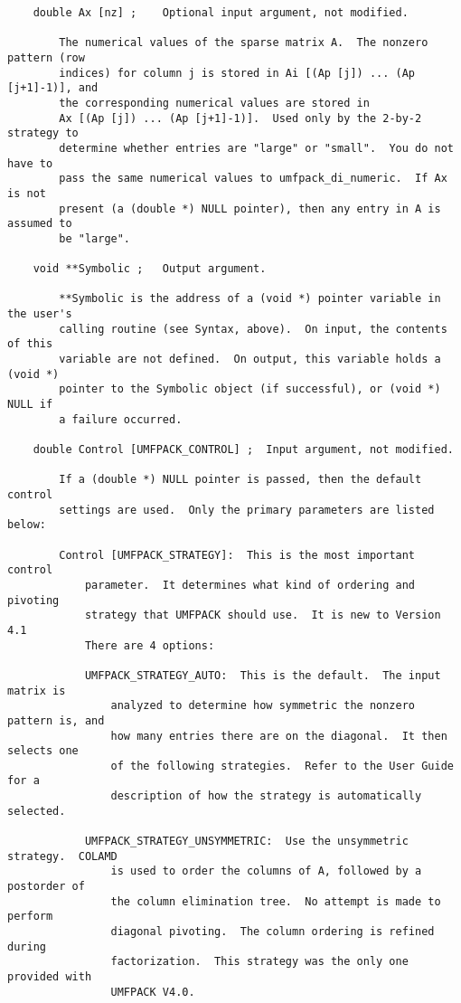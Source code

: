 \documentclass[11pt]{article}
\begin{document}
{\begin{verbatim}
    double Ax [nz] ;    Optional input argument, not modified.

        The numerical values of the sparse matrix A.  The nonzero pattern (row
        indices) for column j is stored in Ai [(Ap [j]) ... (Ap [j+1]-1)], and
        the corresponding numerical values are stored in
        Ax [(Ap [j]) ... (Ap [j+1]-1)].  Used only by the 2-by-2 strategy to
        determine whether entries are "large" or "small".  You do not have to
        pass the same numerical values to umfpack_di_numeric.  If Ax is not
        present (a (double *) NULL pointer), then any entry in A is assumed to
        be "large".

    void **Symbolic ;   Output argument.

        **Symbolic is the address of a (void *) pointer variable in the user's
        calling routine (see Syntax, above).  On input, the contents of this
        variable are not defined.  On output, this variable holds a (void *)
        pointer to the Symbolic object (if successful), or (void *) NULL if
        a failure occurred.

    double Control [UMFPACK_CONTROL] ;  Input argument, not modified.

        If a (double *) NULL pointer is passed, then the default control
        settings are used.  Only the primary parameters are listed below:

        Control [UMFPACK_STRATEGY]:  This is the most important control
            parameter.  It determines what kind of ordering and pivoting
            strategy that UMFPACK should use.  It is new to Version 4.1
            There are 4 options:

            UMFPACK_STRATEGY_AUTO:  This is the default.  The input matrix is
                analyzed to determine how symmetric the nonzero pattern is, and
                how many entries there are on the diagonal.  It then selects one
                of the following strategies.  Refer to the User Guide for a
                description of how the strategy is automatically selected.

            UMFPACK_STRATEGY_UNSYMMETRIC:  Use the unsymmetric strategy.  COLAMD
                is used to order the columns of A, followed by a postorder of
                the column elimination tree.  No attempt is made to perform
                diagonal pivoting.  The column ordering is refined during
                factorization.  This strategy was the only one provided with
                UMFPACK V4.0.


\end{verbatim}}
\end{document}
